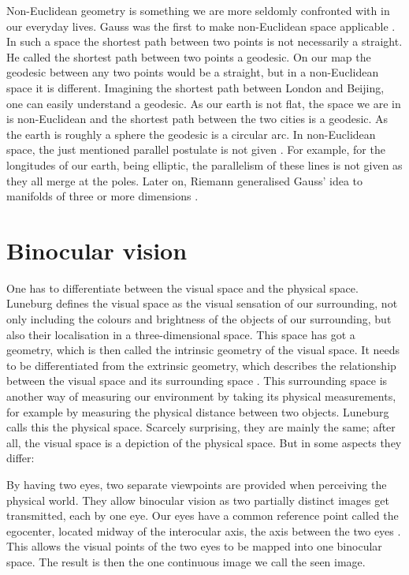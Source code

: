 Non-Euclidean geometry is something we are more seldomly confronted with in our everyday lives. Gauss was the first to make non-Euclidean space applicable \cite{Parrochia.2018}. In such a space the shortest path between two points is not necessarily a straight. He called the shortest path between two points a geodesic. On our map the geodesic between any two points would be a straight, but in a non-Euclidean space it is different. Imagining the shortest path between London and Beijing, one can easily understand a geodesic. As our earth is not flat, the space we are in is non-Euclidean and the shortest path between the two cities is a geodesic. As the earth is roughly a sphere the geodesic is a circular arc.  %
In non-Euclidean space, the just mentioned parallel postulate is not given \cite{Coxeter.1998}. For example, for the longitudes of our earth, being elliptic, the parallelism of these lines is not given as they all merge at the poles.
Later on, Riemann generalised Gauss' idea to manifolds of three or more dimensions \cite{Luneburg.1947}.

\section{Binocular vision}
One has to differentiate between the visual space and the physical space. Luneburg \citeyear{Luneburg.1947} defines the visual space as the visual sensation of our surrounding, not only including the colours and brightness of the objects of our surrounding, but also their localisation in a three-dimensional space. This space has got a geometry, which is then called the intrinsic geometry of the visual space. It needs to be differentiated from the extrinsic geometry, which describes the relationship between the visual space and its surrounding space \cite{Fernandez.2009}. This surrounding space is another way of measuring our environment by taking its physical measurements, for example by measuring the physical distance between two objects. Luneburg calls this the physical space. Scarcely surprising, they are mainly the same; after all, the visual space is a depiction of the physical space. But in some aspects they differ:

By having two eyes, two separate viewpoints are provided when perceiving the physical world. They allow binocular vision as two partially distinct images get transmitted, each by one eye. Our eyes have a common reference point called the egocenter, %
located midway of the interocular axis, the axis between the two eyes \cite{DeValois.2000}. This allows the visual points of the two eyes to be mapped into one binocular space.
The result is then the one continuous image we call the seen image. 

